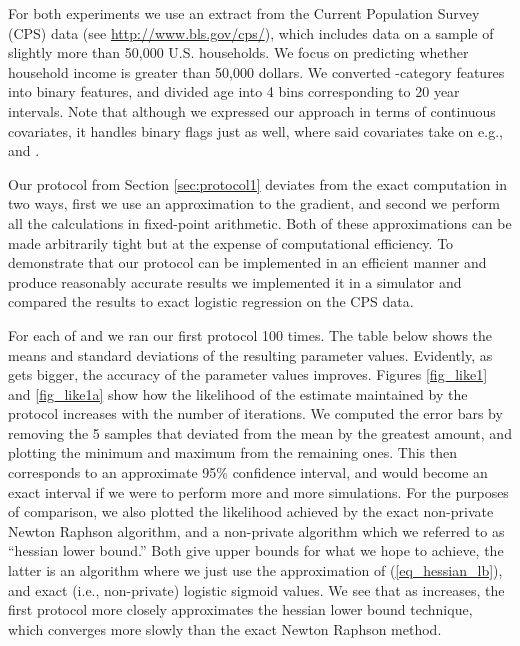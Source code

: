 \documentclass[11pt]{article}
\begin{document}
For both experiments we use an extract from the Current Population Survey (CPS) data (see \url{http://www.bls.gov/cps/}), which includes data on a sample of slightly more than  50,000 U.S. households.  We focus on predicting whether  household income is greater than 50,000 dollars.  We converted -category features into  binary features, and divided age into 4 bins corresponding to 20 year intervals.  Note that although we expressed our approach in terms of continuous covariates, it handles binary flags just as well, where said covariates take on e.g.,  and .

Our protocol from Section \ref{sec:protocol1} deviates from the exact computation in two ways, first we use an approximation to the gradient, and second we perform all the calculations in fixed-point arithmetic.  Both of these approximations can be made arbitrarily tight but at the expense of computational efficiency.  To demonstrate that our protocol can be implemented in an efficient manner and produce reasonably accurate results we implemented it in a simulator and compared the results to exact logistic regression on the CPS data.



For each of  and  we ran our first protocol 100 times. The table below shows the means and standard deviations of the resulting parameter values.  Evidently, as  gets bigger, the accuracy of the parameter values improves.  Figures \ref{fig_like1} and \ref{fig_like1a} show how the likelihood of the estimate maintained by the protocol increases with the number of iterations.  We computed the error bars   by removing the 5 samples that deviated from the mean by the greatest amount, and plotting the minimum and maximum from the remaining ones.  This then corresponds to an approximate 95\% confidence interval, and would become an exact interval if we were to perform more and more simulations.  For the purposes of comparison, we also plotted the likelihood achieved by the exact non-private Newton Raphson algorithm, and a non-private algorithm which we referred to as ``hessian lower bound.''  Both give upper bounds for what we  hope to achieve, the latter is an algorithm where we just use the approximation of (\ref{eq_hessian_lb}), and exact (i.e., non-private) logistic sigmoid values.  We see that as  increases, the first protocol more closely approximates the hessian lower bound technique, which converges more slowly than the exact Newton Raphson method.
\end{document}
